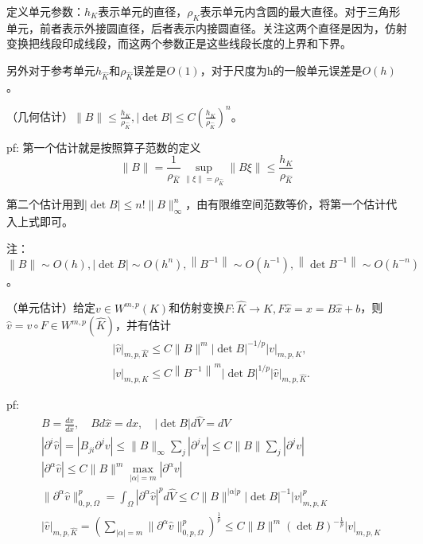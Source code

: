 定义单元参数：$h_K$表示单元的直径，$\rho_K$表示单元内含圆的最大直径。对于三角形单元，前者表示外接圆直径，后者表示内接圆直径。关注这两个直径是因为，仿射变换把线段印成线段，而这两个参数正是这些线段长度的上界和下界。

另外对于参考单元$h_{\widehat{K}}$和$\rho_{\widehat{K}}$误差是$O(1)$，对于尺度为h的一般单元误差是$O(h)$。

\begin{lem}
  （几何估计）$\|B\| \le \frac{h_{K}}{\rho_{\widehat{K}}},|\operatorname{det} B| \le C\left(\frac{h_{K}}{\rho_{\widehat{K}}}\right)^{n}$。
\end{lem}

pf: 第一个估计就是按照算子范数的定义
\[
  \|B\|=\frac{1}{\rho_{\widehat{K}}} \sup_{\|\xi\|=\rho_{\widehat{K}}}\|B \xi\| \le \frac{h_K}{\rho_{\widehat{K}}}
\]

第二个估计用到$|\operatorname{det} B| \le n!\|B\|_{\infty}^n$，由有限维空间范数等价，将第一个估计代入上式即可。

注：$\|B\| \sim O(h),|\operatorname{det} B| \sim O\left(h^{n}\right),\left\|B^{-1}\right\| \sim O\left(h^{-1}\right), \left\|\operatorname{det} B^{-1}\right\| \sim O\left(h^{-n}\right)$。

\begin{lem}
  （单元估计）给定$v \in W^{m, p}(K)$和仿射变换$F: \widehat{K} \rightarrow K, F \widehat{x} = x = B \widehat{x}+b$，则$\widehat{v}=v \circ F \in W^{m, p}(\widehat{K})$，并有估计
  \[
    \begin{aligned}
      &|\widehat{v}|_{m, p, \widehat{K}} \le C\|B\|^{m}|\operatorname{det} B|^{-1 / p}|v|_{m, p, K}, \\
      &|v|_{m, p, K} \le C\left\|B^{-1}\right\|^{m}|\operatorname{det} B|^{1 / p}|\widehat{v}|_{m, p, \widehat{K}}.
    \end{aligned}
  \]
\end{lem}

pf: \[
  \begin{aligned}
    &B = \frac{dx}{d\widehat{x}}, \quad B d\widehat{x} = dx, \quad |\operatorname{det}B| d\widehat{V} = dV\\
    &|\partial^i \widehat{v}| = |B_{ji} \partial^j v| \le \|B\|_{\infty} \sum_{j} |\partial^j v| \le C\|B\| \sum_{j} |\partial^j v|\\
    &|\partial^\alpha \widehat{v}| \le C\|B\|^m \max_{|\alpha| = m} |\partial^\alpha v|\\
    &\|\partial^\alpha \widehat{v}\|_{0, p, \Omega}^p = \int_\Omega |\partial^\alpha \widehat{v}|^p d\widehat{V} \le C \|B\|^{|\alpha|p} |\operatorname{det}B|^{-1} |v|_{m, p, K}^p\\
    &|\widehat{v}|_{m, p, \widehat{K}} = \left(\sum_{|\alpha| = m} \|\partial^\alpha \widehat{v}\|_{0, p, \Omega}^p\right)^{\frac{1}{p}} \le C\|B\|^{m} (\operatorname{det}B)^{-\frac{1}{p}} |v|_{m, p, K}\\
  \end{aligned}
\]

